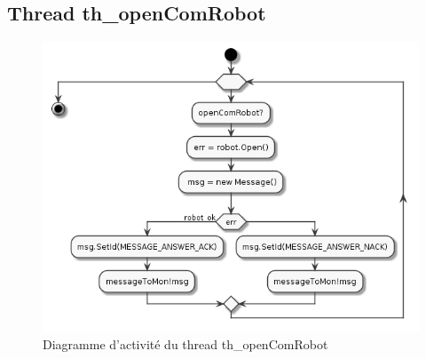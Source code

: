 \documentclass[11pt,a4paper]{paper}
\begin{document}
\subsection{Thread th\_openComRobot}
 \begin{figure}[htbp]
\begin{center}
\includegraphics[scale=0.4]{figures_pdf/activity/th_openComRobot}
\end{center}
\caption{Diagramme d'activité du thread th\_openComRobot}
\end{figure}
\FloatBarrier
\end{document}
